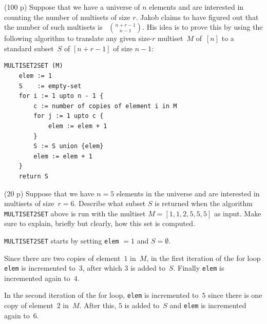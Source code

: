 \documentclass{jn-pset}
\begin{document}

\begin{problem}%
  \label{problem:multisets}%
  (100 p)  
  Suppose that we have a universe of $n$ elements and are interested
  in counting the number of multisets of size $r$.
  Jakob claims to have figured out that the number of such multisets is~%
  $\binom{n + r - 1}{n-1}$.
  His idea is to prove this by
  using the following algorithm to translate
  any given size-$r$ multiset~$M$ of~$[n]$
  to a standard subset~$S$ of $[n + r - 1]$ of size $n-1$:
\begin{verbatim}
MULTISET2SET (M)
    elem := 1
    S    := empty-set
    for i := 1 upto n - 1 {
        c := number of copies of element i in M
        for j := 1 upto c {
            elem := elem + 1
        }
        S := S union {elem}
        elem := elem + 1
    }
    return S
\end{verbatim}

  \begin{subproblem}%
    \label{problem:multiset-1}%
    {(20 p)}
    {\ignorespaces}
    Suppose that we have $n = 5$ elements in the universe and are interested in
    multisets of \mbox{size $r = 6$}.
%   
%   
    Describe what subset $S$ is returned when the algorithm
    \verb+MULTISET2SET+
    above is run with the multiset
    $M = [1, 1, 2, 5, 5, 5]$
    as input.
    Make sure to explain, briefly but clearly,
    how this set is computed.
  \end{subproblem}

\begin{solution}
  \verb+MULTISET2SET+ starts by setting
  \verb+elem+ $=1$
  and
  $S = \emptyset$.
  
  Since there are two copies of element~$1$ in~$M$,
  in the first iteration of the for loop
  \verb+elem+ is incremented to~$3$,
  after which $3$ is added to~$S$.
  Finally
  \verb+elem+ is incremented again to~$4$.

  In the second iteration of the for loop, 
  \verb+elem+ is incremented to~$5$
  since there is one copy of element~$2$ in~$M$.
  After this, 
  $5$ is added to~$S$
  and  \verb+elem+ is incremented again to~$6$.

  
  

\end{solution}
\end{problem}
\end{document}
